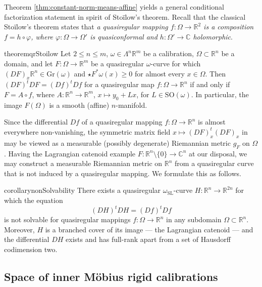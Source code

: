 \documentclass[a4paper,leqno,11pt]{amsart}
\numberwithin{equation}{section}
\theoremstyle{remark}
\theoremstyle{remark}
\newcommand{\R}{\mathbb{R}}
\newcommand{\C}{\mathbb{C}}
\newcommand{\Gr}{\mathrm{Gr}}
\newcommand{\SL}{\mathrm{SL}}
\newcommand{\SO}{\mathrm{SO}}
\begin{document}
Theorem \ref{thm:constant-norm-means-affine} yields a general conditional factorization statement in spirit of Sto\"ilow's theorem. Recall that the classical Sto\"ilow's theorem states that \emph{a quasiregular mapping $f\colon \Omega \to \R^2$ is a composition $f = h \circ \varphi$, where $\varphi \colon \Omega \to \Omega'$ is quasiconformal and $h \colon \Omega' \to \C$ holomorphic}.

\begin{restatable}{theorem}{qrStoilow}
\label{thm:quasiregular-Stoilow}
Let $2\le n \le m$, $\omega \in \Lambda^n \R^m$ be a calibration, $\Omega \subset \R^n$ be a domain, and let $F\colon \Omega \to \R^m$ be a quasiregular $\omega$-curve for which $(DF)_x\R^n \in \Gr(\omega)$ and $\star F^{*}\omega(x) \geq 0$ for almost every $x\in \Omega$. Then $(DF)^t DF = (Df)^t Df$ for a quasiregular map $f \colon \Omega \to \R^n$ if and only if $F = A \circ f$, where $A\colon \R^n \to \R^m$, $x\mapsto y_0 + Lx$, for $L\in \SO(\omega)$. In particular, the image $F(\Omega)$ is a smooth (affine) $n$-manifold.
\end{restatable}


Since the differential $Df$ of a quasiregular mapping $f\colon \Omega \to \R^n$ is almost everywhere non-vanishing, the symmetric matrix field $x\mapsto (DF)_x^t (DF)_x$ in  may be viewed as a measurable (possibly degenerate) Riemannian metric $g_F$ on $\Omega$. Having the Lagrangian catenoid example $F\colon \R^n\setminus \{0\} \to \C^n$ at our disposal, we may construct a measurable Riemannian metric on $\R^n$ from a quasiregular curve that is not induced by a quasiregular mapping. We formulate this as follows.

\begin{restatable}{corollary}{nonSolvability}
\label{cor:non-solvability}
There exists a quasiregular $\omega_\SL$-curve $H \colon \R^n \to \R^{2n}$ for which the equation 
\[
    (DH)^t DH = (Df)^t Df
\]
is not solvable for quasiregular mappings $f\colon \Omega \to \R^n$ in any subdomain $\Omega \subset \R^n$. Moreover, $H$ is a branched cover of its image --- the Lagrangian catenoid --- and the differential $DH$ exists and has full-rank apart from a set of Hausdorff codimension two.
\end{restatable}



\subsection{Space of inner Möbius rigid calibrations}
\end{document}
